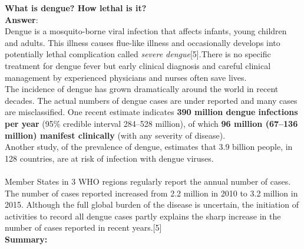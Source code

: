 \documentclass[11pt]{exam}
\begin{document}
\begin{questions}
\question
\label{Q2.Lethal dengue} 
\textbf{What is dengue? How lethal is it?}\\
\textbf{Answer}:\\
Dengue is a mosquito-borne viral infection that affects infants, young children and adults. This illness causes flue-like illness and occasionally develops into potentially lethal complication called \textit{severe dengue}[5].There is no specific treatment for dengue fever but early clinical diagnosis and careful clinical management by experienced physicians and nurses often save lives. \\
The incidence of dengue has grown dramatically around the world in recent decades. The actual numbers of dengue cases are under reported and many cases are misclassified. One recent estimate indicates \textbf{390 million dengue infections per year} (95\% credible interval 284–528 million), of which \textbf{96 million (67–136 million) manifest clinically} (with any severity of disease). \\ Another study, of the prevalence of dengue, estimates that 3.9 billion people, in 128 countries, are at risk of infection with dengue viruses. \\ \\
Member States in 3 WHO regions regularly report the annual number of cases. The number of cases reported increased from 2.2 million in 2010 to 3.2 million in 2015. Although the full global burden of the disease is uncertain, the initiation of activities to record all dengue cases partly explains the sharp increase in the number of cases reported in recent years.[5]\\ 
\textbf{Summary:} \\
\\ \\


\end{questions}
\end{document}
